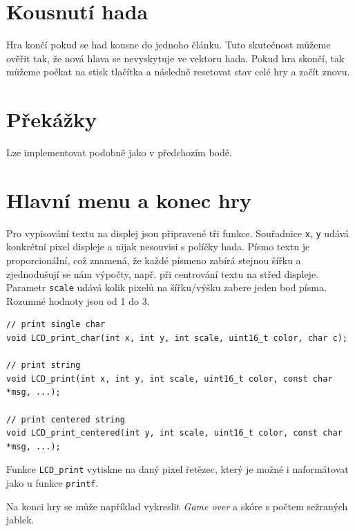 \documentclass[12pt]{article}
\begin{document}
\section{Kousnutí hada}
Hra končí pokud se had kousne do jednoho článku.
Tuto skutečnost můžeme ověřit tak, že nová hlava se nevyskytuje ve vektoru hada.
Pokud hra skončí, tak můžeme počkat na stisk tlačítka a následně resetovat stav celé hry a začít znovu.

\section{Překážky}
Lze implementovat podobně jako v předchozím bodě.

\section{Hlavní menu a konec hry}
Pro vypisování textu na displej jsou připravené tři funkce.
Souřadnice \texttt{x}, \texttt{y} udává konkrétní pixel displeje a nijak nesouvisi s políčky hada.
Písmo textu je proporcionální, což znamená, že každé písmeno zabírá stejnou šířku a zjednodušují se nám výpočty, např. při centrování textu na střed displeje.
Parametr \texttt{scale} udává kolik pixelů na šířku/výšku zabere jeden bod písma.
Rozumné hodnoty jsou od 1 do 3.


\begin{verbatim}
// print single char
void LCD_print_char(int x, int y, int scale, uint16_t color, char c);

// print string
void LCD_print(int x, int y, int scale, uint16_t color, const char *msg, ...);

// print centered string
void LCD_print_centered(int y, int scale, uint16_t color, const char *msg, ...);
\end{verbatim}

Funkce \texttt{LCD\_print} vytiskne na daný pixel řetězec, který je možné i naformátovat jako u funkce \texttt{printf}.

Na konci hry se může například vykreslit \textit{Game over} a skóre s počtem sežraných jablek.
\end{document}
